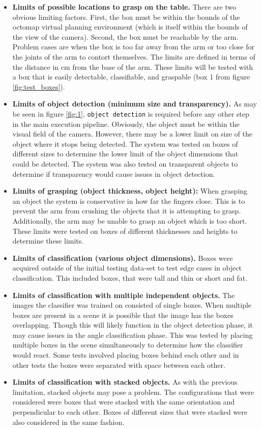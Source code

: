 \documentclass[letterpaper, 10 pt, conference]{conf/ieeeconf}  %
\begin{document}
\begin{itemize}
\item \textbf{Limits of possible locations to grasp on the table.}
  There are two obvious limiting factors. First, the box must be within the
  bounds of the octomap virtual planning environment (which is itself within the
  bounds of the view of the camera). Second, the box must be reachable by the arm.
  Problem cases are when the box is too far away from the arm or too close for the
  joints of the arm to contort themselves. The limits are defined in terms of the
  distance in \si{\centi\meter} from the base of the arm. These limits will be
  tested with a box that is easily detectable, classifiable, and graspable (box 1
  from figure \ref{fig:test_boxes}).
\item \textbf{Limits of object detection (minimum size and transparency).}
  As may be seen in figure \ref{fig:1}, \texttt{object detection} is required
  before any other step in the main execution pipeline. Obviously, the object must
  be within the visual field of the camera. However, there may be a lower limit on
  size of the object where it stops being detected. The system was tested on boxes
  of different sizes to determine the lower limit of the object dimensions that
  could be detected. The system was also tested on transparent objects to
  determine if transparency would cause issues in object detection.
\item \textbf{Limits of grasping (object thickness, object height):}
  When grasping an object the system is conservative in how far the fingers
  close. This is to prevent the arm from crushing the objects that it is
  attempting to grasp. Additionally, the arm may be unable to grasp an object
  which is too short. These limits were tested on boxes of different thicknesses
  and heights to determine these limits.
\item \textbf{Limits of classification (various object dimensions).}
  Boxes were acquired outside of the initial testing data-set to test edge cases
  in object classification. This included boxes, that were tall and
  thin or short and fat.
\item \textbf{Limits of classification with multiple independent objects.}
  The images the classifier was trained on consisted of single boxes. When
  multiple boxes are present in a scene it is possible that the image has the
  boxes overlapping. Though this will likely function in the object detection
  phase, it may cause issues in the angle classification phase. This was tested by
  placing multiple boxes in the scene simultaneously to determine how the
  classifier would react. Some tests involved placing boxes behind each other and
  in other tests the boxes were separated with space between each other.
\item \textbf{Limits of classification with stacked objects.}
  As with the previous limitation, stacked objects may pose a problem. The
  configurations that were considered were boxes that were stacked with the same
  orientation and perpendicular to each other. Boxes of different sizes that were
  stacked were also considered in the same fashion.
\end{itemize}
\end{document}
